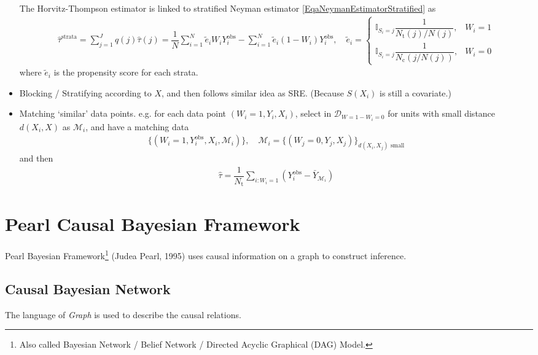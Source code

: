 \begin{itemize}[topsep=2pt,itemsep=0pt]
    The Horvitz-Thompson estimator is linked to stratified Neyman estimator \autoref{EqaNeymanEstimatorStratified} as
    \begin{align}
         \hat{\tau}^\mathrm{strata}=\sum_{j=1}^Jq(j)\hat{\tau}(j)= \dfrac{1}{N} \sum_{i=1}^N \tilde{e} _iW_iY^\mathrm{obs}_i-\sum_{i=1}^N\tilde{e} _i(1-W_i)Y^\mathrm{obs}_i ,\quad \tilde{e} _i=\begin{cases}
            \mathbb{I}_{S_i=j}\dfrac{1}{N_\mathrm{t}(j)/N(j) },&W_i=1\\
            \mathbb{I}_{S_i=j}\dfrac{1}{N_\mathrm{c}(j/N(j)) },&W_i=0
         \end{cases}
    \end{align}
    where $ \tilde{e }_i $ is the propensity score for each strata.
    \item Blocking / Stratifying according to $ X $, and then follows similar idea as SRE. (Because $ S(X_i) $ is still a covariate.)
    \item Matching `similar' data points. e.g. for each data point $ (W_i=1,Y_i,X_i) $, select in $ \mathcal{D}_{W=1-W_i=0} $ for units with small distance $ d(X_i,X) $ as $ \mathcal{M}_i $, and have a matching data
    \begin{align}
        \{(W_i=1,Y_i^\mathrm{obs} ,X_i,\mathcal{M}_i)\},\quad \mathcal{M}_i=\{(W_j=0,Y_j,X_j)\}_{d(X_i,X_j)\text{ small}} 
    \end{align}
    and then
    \begin{align}
        \hat{\tau} =\dfrac{1}{N_\mathrm{t} }\sum_{i:W_i=1}\left(Y_i^\mathrm{obs}-\bar{Y}_{\mathcal{M}_i} \right)
    \end{align}
\end{itemize}


\section{Pearl Causal Bayesian Framework}
    Pearl Bayesian Framework\footnote{Also called Bayesian Network / Belief Network / Directed Acyclic Graphical (DAG) Model.} (Judea Pearl, 1995) uses causal information on a graph to construct inference. 

    
\subsection{Causal Bayesian Network}
The language of \textit{Graph} is used to describe the causal relations. 

